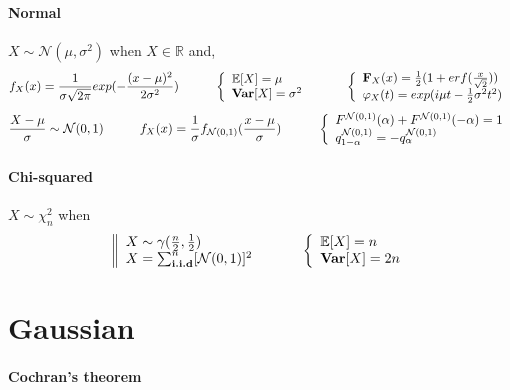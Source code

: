 \documentclass[a4paper,10pt]{article}
\begin{document}
\paragraph{Normal} $X\sim \mathcal{N}(\mu,\sigma^2)$ when $X \in \mathbb{R}$ and,
\[
f_{X}(x) = \frac{1}{\sigma \sqrt{2\pi}} exp (-\frac{(x-\mu)^2}{2\sigma^2})
\hspace{10mm}
\left\{
\begin{array}{l}
\mathbb{E}[X]=\mu \\
\textbf{Var}[X]=\sigma^2
\end{array}\right.
\hspace{10mm}
\left\{
\begin{array}{l}
\textbf{F}_X(x) =  \frac{1}{2}(1+erf(\frac{x}{\sqrt{2}})) \\
\varphi_{X}(t) = exp(i\mu t - \frac{1}{2}\sigma^2 t^2)
\end{array}\right.
\]
\[
\frac{X - \mu}{\sigma} \sim \mathcal{N}(0,1)
\hspace{10mm}
f_{X}(x) = \frac{1}{\sigma}f_{\mathcal{N}(0,1)}(\frac{x-\mu}{\sigma})
\hspace{10mm}
\left\{
\begin{array}{l}
F^{\mathcal{N}(0,1)} (\alpha) + F^{\mathcal{N}(0,1)}(-\alpha) = 1 \\
q^{\mathcal{N}(0,1)}_{1-\alpha} = - q^{\mathcal{N}(0,1)}_{\alpha} 
\end{array}\right.
\]

\paragraph{Chi-squared} $X\sim \chi^2_n$ when 
\[
\left\|
\begin{array}{l}
X \sim \gamma(\frac{n}{2}, \frac{1}{2}) \\
X = \sum^{n}_{\textbf{i.i.d}} [ \mathcal{N}(0,1) ]^2
\end{array}\right.
\hspace{10mm}
\left\{
\begin{array}{l}
\mathbb{E}[X]= n \\
\textbf{Var}[X]=2n
\end{array}\right.
\]

\section{Gaussian}
\paragraph{Cochran's theorem}
\end{document}
